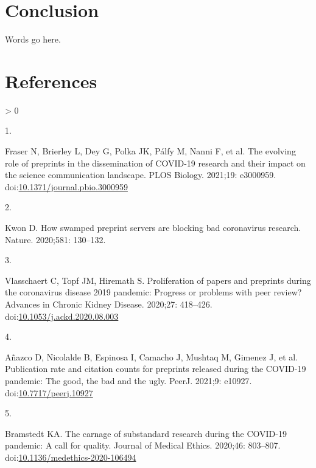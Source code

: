 \documentclass[10pt,letterpaper]{article}
\newlength{\csllabelwidth}
\newlength{\cslhangindent}
\newenvironment{CSLReferences}[3] %
 {%
  \setlength{\parindent}{0pt}
  \ifodd #1 \everypar{\setlength{\hangindent}{\cslhangindent}}\ignorespaces\fi
  \ifnum #2 > 0
  \setlength{\parskip}{#2\baselineskip}
  \fi
 }%
 {}
\newcommand{\CSLLeftMargin}[1]{\parbox[t]{\csllabelwidth}{#1}}
\newcommand{\CSLRightInline}[1]{\parbox[t]{\linewidth - \csllabelwidth}{#1}}
\begin{document}
\hypertarget{conclusion}{%
\section{Conclusion}\label{conclusion}}

Words go here.

\hypertarget{references}{%
\section*{References}\label{references}}

\hypertarget{refs}{}
\begin{CSLReferences}{0}{0}
\leavevmode\hypertarget{ref-Fraser2021evolving}{}%
\CSLLeftMargin{1. }
\CSLRightInline{Fraser N, Brierley L, Dey G, Polka JK, Pálfy M, Nanni F,
et al. The evolving role of preprints in the dissemination of COVID-19
research and their impact on the science communication landscape. PLOS
Biology. 2021;19: e3000959.
doi:\href{https://doi.org/10.1371/journal.pbio.3000959}{10.1371/journal.pbio.3000959}}

\leavevmode\hypertarget{ref-Kwon2021swamped}{}%
\CSLLeftMargin{2. }
\CSLRightInline{Kwon D. How swamped preprint servers are blocking bad
coronavirus research. Nature. 2020;581: 130--132. }

\leavevmode\hypertarget{ref-Vlasschaert2020proliferation}{}%
\CSLLeftMargin{3. }
\CSLRightInline{Vlasschaert C, Topf JM, Hiremath S. Proliferation of
papers and preprints during the coronavirus disease 2019 pandemic:
Progress or problems with peer review? Advances in Chronic Kidney
Disease. 2020;27: 418--426.
doi:\href{https://doi.org/10.1053/j.ackd.2020.08.003}{10.1053/j.ackd.2020.08.003}}

\leavevmode\hypertarget{ref-Anazco2021publication}{}%
\CSLLeftMargin{4. }
\CSLRightInline{Añazco D, Nicolalde B, Espinosa I, Camacho J, Mushtaq M,
Gimenez J, et al. Publication rate and citation counts for preprints
released during the COVID-19 pandemic: The good, the bad and the ugly.
PeerJ. 2021;9: e10927.
doi:\href{https://doi.org/10.7717/peerj.10927}{10.7717/peerj.10927}}

\leavevmode\hypertarget{ref-Bramstedt2020carnage}{}%
\CSLLeftMargin{5. }
\CSLRightInline{Bramstedt KA. The carnage of substandard research during
the COVID-19 pandemic: A call for quality. Journal of Medical Ethics.
2020;46: 803--807.
doi:\href{https://doi.org/10.1136/medethics-2020-106494}{10.1136/medethics-2020-106494}}


\end{CSLReferences}
\end{document}
